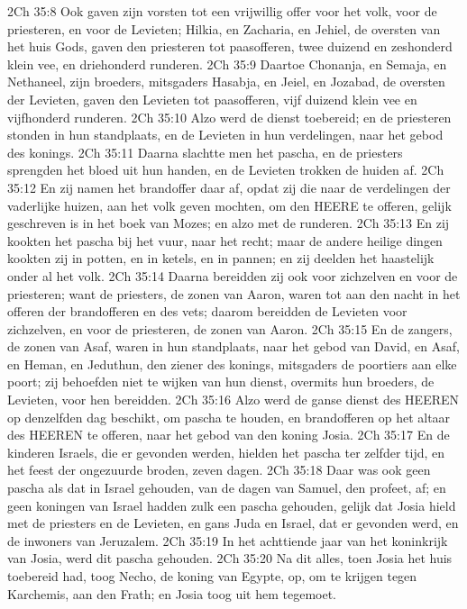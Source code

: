 2Ch 35:8  Ook gaven zijn vorsten tot een vrijwillig offer voor het volk, voor de priesteren, en voor de Levieten; Hilkia, en Zacharia, en Jehiel, de oversten van het huis Gods, gaven den priesteren tot paasofferen, twee duizend en zeshonderd klein vee, en driehonderd runderen.
2Ch 35:9  Daartoe Chonanja, en Semaja, en Nethaneel, zijn broeders, mitsgaders Hasabja, en Jeiel, en Jozabad, de oversten der Levieten, gaven den Levieten tot paasofferen, vijf duizend klein vee en vijfhonderd runderen.
2Ch 35:10  Alzo werd de dienst toebereid; en de priesteren stonden in hun standplaats, en de Levieten in hun verdelingen, naar het gebod des konings.
2Ch 35:11  Daarna slachtte men het pascha, en de priesters sprengden het bloed uit hun handen, en de Levieten trokken de huiden af.
2Ch 35:12  En zij namen het brandoffer daar af, opdat zij die naar de verdelingen der vaderlijke huizen, aan het volk geven mochten, om den HEERE te offeren, gelijk geschreven is in het boek van Mozes; en alzo met de runderen.
2Ch 35:13  En zij kookten het pascha bij het vuur, naar het recht; maar de andere heilige dingen kookten zij in potten, en in ketels, en in pannen; en zij deelden het haastelijk onder al het volk.
2Ch 35:14  Daarna bereidden zij ook voor zichzelven en voor de priesteren; want de priesters, de zonen van Aaron, waren tot aan den nacht in het offeren der brandofferen en des vets; daarom bereidden de Levieten voor zichzelven, en voor de priesteren, de zonen van Aaron.
2Ch 35:15  En de zangers, de zonen van Asaf, waren in hun standplaats, naar het gebod van David, en Asaf, en Heman, en Jeduthun, den ziener des konings, mitsgaders de poortiers aan elke poort; zij behoefden niet te wijken van hun dienst, overmits hun broeders, de Levieten, voor hen bereidden.
2Ch 35:16  Alzo werd de ganse dienst des HEEREN op denzelfden dag beschikt, om pascha te houden, en brandofferen op het altaar des HEEREN te offeren, naar het gebod van den koning Josia.
2Ch 35:17  En de kinderen Israels, die er gevonden werden, hielden het pascha ter zelfder tijd, en het feest der ongezuurde broden, zeven dagen.
2Ch 35:18  Daar was ook geen pascha als dat in Israel gehouden, van de dagen van Samuel, den profeet, af; en geen koningen van Israel hadden zulk een pascha gehouden, gelijk dat Josia hield met de priesters en de Levieten, en gans Juda en Israel, dat er gevonden werd, en de inwoners van Jeruzalem.
2Ch 35:19  In het achttiende jaar van het koninkrijk van Josia, werd dit pascha gehouden.
2Ch 35:20  Na dit alles, toen Josia het huis toebereid had, toog Necho, de koning van Egypte, op, om te krijgen tegen Karchemis, aan den Frath; en Josia toog uit hem tegemoet.
